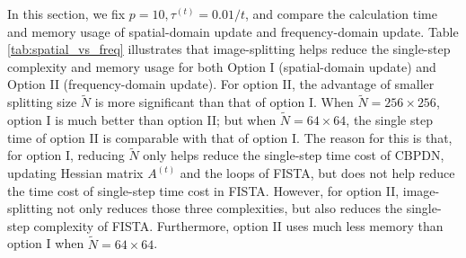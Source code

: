 \documentclass[final]{siamart1116}
\begin{document}
In this section, we fix $p=10,\tau^{(t)}=0.01/t$, and compare the calculation time and memory usage of spatial-domain update and frequency-domain update.  Table \ref{tab:spatial_vs_freq} illustrates that image-splitting helps reduce the single-step complexity and memory usage for both Option I (spatial-domain update) and Option II (frequency-domain update). For option II, the advantage of smaller splitting size $\tilde{N}$ is more significant than that of option I. When $\tilde{N}=256\times256$, option I is much better than option II; but when $\tilde{N}=64\times64$, the single step time of option II is comparable with that of option I. The reason for this is that, for option I, reducing $\tilde{N}$ only helps reduce the single-step time cost of CBPDN, updating Hessian matrix $A^{(t)}$ and the loops of FISTA, but does not help reduce the time cost of single-step time cost in FISTA. However, for option II, image-splitting not only reduces those three complexities, but also reduces the single-step complexity of FISTA. Furthermore, option II uses much less memory than option I when $\tilde{N}=64\times64$.
\end{document}
